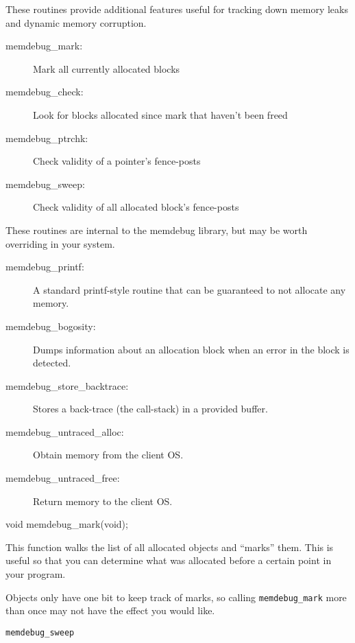 
These routines provide 
additional features useful for tracking down
memory leaks and dynamic memory corruption.

\begin{description}
\item[memdebug_mark:] Mark all currently allocated blocks
\item[memdebug_check:] Look for blocks allocated since mark that haven't been freed
\item[memdebug_ptrchk:] Check validity of a pointer's fence-posts
\item[memdebug_sweep:] Check validity of all allocated block's fence-posts
\end{description}

These routines are internal to the memdebug library, but may be
worth overriding in your system.

\begin{description}
\item[memdebug_printf:] A standard printf-style routine that can be
	guaranteed to not allocate any memory.
\item[memdebug_bogosity:] Dumps information about an allocation block
	when an error in the block is detected.
\item[memdebug_store_backtrace:] Stores a back-trace (the call-stack)
	in a provided buffer.
\item[memdebug_untraced_alloc:] Obtain memory from the client OS.
\item[memdebug_untraced_free:] Return memory to the client OS.
\end{description}

\begin{apisyn}

	\funcproto void
	memdebug_mark(void);
\end{apisyn}
\begin{apidesc}
	This function walks the list of all allocated objects and
	``marks'' them.  This is useful so that you can determine what
	was allocated before a certain point in your program.

	Objects only have one bit to keep track of marks, so calling
	{\tt memdebug_mark} more than once may not have the effect
	you would like.
\end{apidesc}
\begin{apirel}
	{\tt memdebug_sweep}
\end{apirel}

